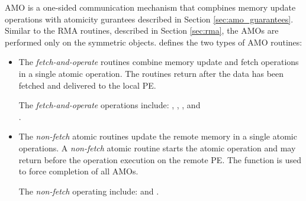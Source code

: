 \label{sec:amo}
\ac{AMO} is a one-sided communication mechanism that compbines memory update operations with atomicity gurantees described in Section \ref{sec:amo_guarantees}. 
Similar to the \ac{RMA} routines, described in Section \ref{sec:rma},
the \acp{AMO} are performed only on the symmetric objects. 
\openshmem{} defines the two types of \ac{AMO} routines:
\begin{itemize}
\item %
The \textit{fetch-and-operate} routines combine memory update and fetch 
operations in a single atomic operation.
The routines return after the data has been fetched and delivered to the local PE.

The \textit{fetch-and-operate} operations include: , , , and\\ .

\item %
The \textit{non-fetch} atomic routines update the remote memory 
in a single atomic operations.
A \textit{non-fetch} atomic routine
starts the atomic operation and may return before the operation execution
on the remote PE.
The  function is used to force completion of all \acp{AMO}.

The \textit{non-fetch} operating include:  and .
\end{itemize}

